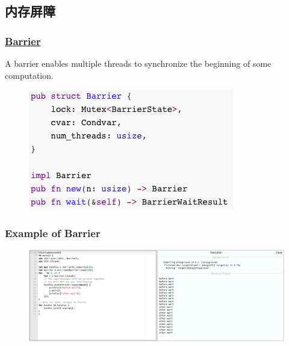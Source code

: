 \subsection{内存屏障} %
\begin{frame}[fragile]
    \frametitle{\href{https://doc.rust-lang.org/std/sync/struct.Barrier.html}{Barrier}}

A barrier enables multiple threads to synchronize the beginning of some computation.

    \begin{figure}
    \includegraphics[width=0.8\linewidth]{figs/struct-barrier.png}
    \end{figure}

\end{frame}
% 
% 
% 
% 
% 
% 
\begin{frame}[fragile]
    \frametitle{Example of Barrier}
    \begin{figure}
    \includegraphics[width=0.8\linewidth]{figs/demo-barrier.png}
    \end{figure}

\end{frame}
